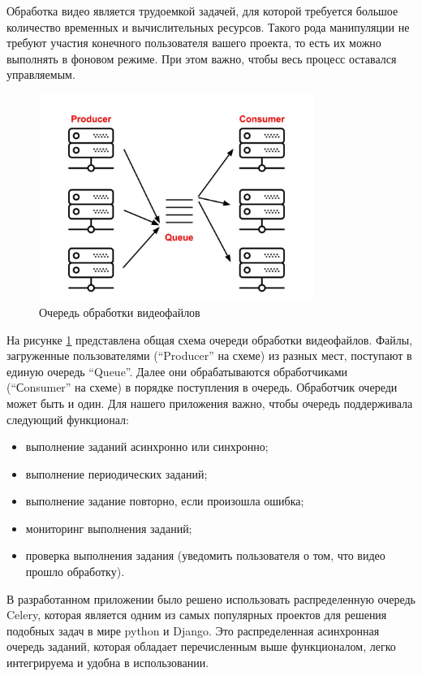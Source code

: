 Обработка видео является трудоемкой задачей, для которой требуется большое количество временных
и вычислительных ресурсов. Такого рода манипуляции не требуют участия конечного пользователя
вашего проекта, то есть их можно выполнять в фоновом режиме. При этом важно,
чтобы весь процесс оставался управляемым.

\begin{figure}
  \centering
  \includegraphics[width=0.8\textwidth]{images/producer-consumer.jpg}
  \caption{Очередь обработки видеофайлов\label{producer-consumer}}
\end{figure}

На рисунке \ref{producer-consumer} представлена общая схема очереди обработки видеофайлов.
Файлы, загруженные пользователями (“Producer” на схеме) из разных мест,
поступают в единую очередь “Queue”. Далее они обрабатываются обработчиками (“Сonsumer” на схеме)
в порядке поступления в очередь. Обработчик очереди может быть и один.
Для нашего приложения важно, чтобы очередь поддерживала следующий функционал:
\begin{itemize}[wide,topsep=0pt]
  \itemsep0em
  \item выполнение заданий асинхронно или синхронно;
  \item выполнение периодических заданий;
  \item выполнение задание повторно, если произошла ошибка;
  \item мониторинг выполнения заданий;
  \item проверка выполнения задания (уведомить пользователя о том, что видео прошло обработку).
\end{itemize}

В разработанном приложении было решено использовать распределенную очередь Celery,
которая является одним из самых популярных проектов для решения подобных задач в мире
python и Django. Это распределенная асинхронная очередь заданий, которая обладает
перечисленным выше функционалом, легко интегрируема и удобна в использовании.

